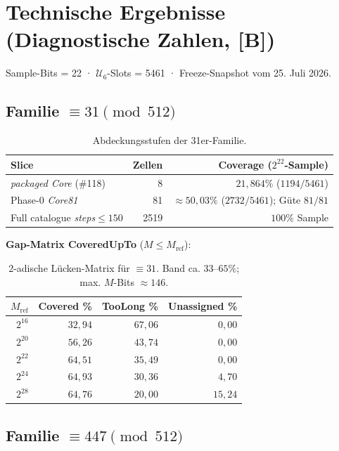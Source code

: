 \documentclass[11pt,a4paper]{article}
\theoremstyle{definition}
\theoremstyle{remark}
\newcommand{\Mref}{M_{\mathrm{ref}}}
\newcommand{\U}{\mathcal{U}} %
\begin{document}
	\section{Technische Ergebnisse (Diagnostische Zahlen, [B])}
	
	Sample-Bits = 22 · $\U_6$-Slots = 5461 · Freeze-Snapshot vom 25. Juli 2026.
	
	\subsection{Familie $\equiv 31 \pmod{512}$}
	
	\begin{table}[h!]
		\centering
		\begin{tabular}{l r r}
			\toprule
			\textbf{Slice} & \textbf{Zellen} & \textbf{Coverage ($2^{22}$-Sample)} \\
			\midrule
			\textit{packaged Core} (\#118) & 8 & \textbf{$21{,}864\%$} ($1194 / 5461$) \\
			Phase-0 \textit{Core81} & 81 & \textbf{$\approx 50{,}03\%$} ($2732 / 5461$); Güte $81/81$ \\
			Full catalogue \textit{steps}$\le 150$ & 2519 & \textbf{$100\%$} Sample \\
			\bottomrule
		\end{tabular}
		\caption{Abdeckungsstufen der 31er-Familie.}
	\end{table}
	
	\noindent\textbf{Gap-Matrix CoveredUpTo} ($M \le \Mref$):
	\begin{table}[h!]
		\centering
		\begin{tabular}{r r r r}
			\toprule
			$\Mref$ & \textbf{Covered \%} & \textbf{TooLong \%} & \textbf{Unassigned \%} \\
			\midrule
			$2^{16}$ & $32{,}94$ & $67{,}06$ & $0{,}00$ \\
			$2^{20}$ & $56{,}26$ & $43{,}74$ & $0{,}00$ \\
			$2^{22}$ & $64{,}51$ & $35{,}49$ & $0{,}00$ \\
			$2^{24}$ & $64{,}93$ & $30{,}36$ & $4{,}70$ \\
			$2^{28}$ & $64{,}76$ & $20{,}00$ & $15{,}24$ \\
			\bottomrule
		\end{tabular}
		\caption{2-adische Lücken-Matrix für $\equiv 31$. Band ca. $33$--$65\%$; max. $M$-Bits $\approx 146$.}
	\end{table}
	
	\subsection{Familie $\equiv 447 \pmod{512}$}
	
\end{document}
